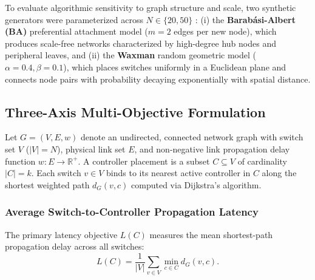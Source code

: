 \documentclass[conference]{IEEEtran}
\begin{document}
To evaluate algorithmic sensitivity to graph structure and scale, two synthetic generators were parameterized across $N \in \{20, 50\}$ \cite{boudi2026, vardhan2025}: (i) the \textbf{Barab\'{a}si-Albert (BA)} preferential attachment model ($m = 2$ edges per new node), which produces scale-free networks characterized by high-degree hub nodes and peripheral leaves, and (ii) the \textbf{Waxman} random geometric model ($\alpha = 0.4, \beta = 0.1$), which places switches uniformly in a Euclidean plane and connects node pairs with probability decaying exponentially with spatial distance.

\subsection{Three-Axis Multi-Objective Formulation}
Let $G = (V, E, w)$ denote an undirected, connected network graph with switch set $V$ ($|V| = N$), physical link set $E$, and non-negative link propagation delay function $w: E \to \mathbb{R}^+$. A controller placement is a subset $C \subseteq V$ of cardinality $|C| = k$. Each switch $v \in V$ binds to its nearest active controller in $C$ along the shortest weighted path $d_G(v, c)$ computed via Dijkstra's algorithm.

\subsubsection{Average Switch-to-Controller Propagation Latency}
The primary latency objective $L(C)$ measures the mean shortest-path propagation delay across all switches:
\begin{equation}
L(C) = \frac{1}{|V|} \sum_{v \in V} \min_{c \in C} d_G(v, c).
\label{eq:latency}
\end{equation}
\end{document}
